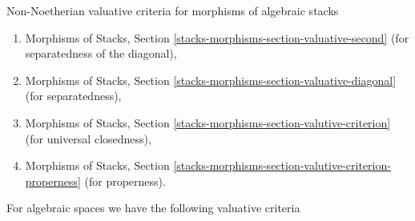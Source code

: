 \documentclass{stacks-project}
\theoremstyle{plain}
\theoremstyle{definition}
\theoremstyle{remark}
\numberwithin{equation}{subsection}
\begin{document}
\medskip\noindent
Non-Noetherian valuative criteria for morphisms of algebraic stacks
\begin{enumerate}
\item Morphisms of Stacks, Section
\ref{stacks-morphisms-section-valuative-second}
(for separatedness of the diagonal),
\item Morphisms of Stacks, Section
\ref{stacks-morphisms-section-valuative-diagonal}
(for separatedness),
\item Morphisms of Stacks, Section
\ref{stacks-morphisms-section-valutive-criterion}
(for universal closedness),
\item Morphisms of Stacks, Section
\ref{stacks-morphisms-section-valutive-criterion-properness}
(for properness).
\end{enumerate}
For algebraic spaces we have the following valuative criteria
\end{document}
